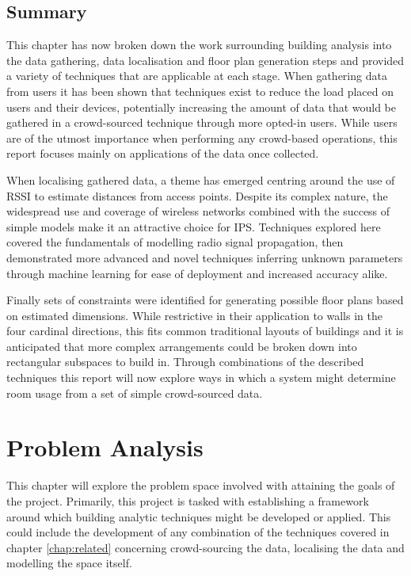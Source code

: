 \documentclass{UoYCSproject}
\begin{document}
        \section{Summary}
        \label{sec:relsum}
        
	        This chapter has now broken down the work surrounding building analysis into the data gathering, data localisation and floor plan generation steps and provided a variety of techniques that are applicable at each stage. When gathering data from users it has been shown that techniques exist to reduce the load placed on users and their devices, potentially increasing the amount of data that would be gathered in a crowd-sourced technique through more opted-in users. While users are of the utmost importance when performing any crowd-based operations, this report focuses mainly on applications of the data once collected.
            
            When localising gathered data, a theme has emerged centring around the use of RSSI to estimate distances from access points. Despite its complex nature, the  widespread use and coverage of wireless networks combined with the success of simple models make it an attractive choice for IPS. Techniques explored here covered the fundamentals of modelling radio signal propagation, then demonstrated more advanced and novel techniques inferring unknown parameters through machine learning for ease of deployment and increased accuracy alike.
            
            Finally sets of constraints were identified for generating possible floor plans based on estimated dimensions. While restrictive in their application to walls in the four cardinal directions, this fits common traditional layouts of buildings and it is anticipated that more complex arrangements could be broken down into rectangular subspaces to build in. Through combinations of the described techniques this report will now explore ways in which a system might determine room usage from a set of simple crowd-sourced data.

    \chapter{Problem Analysis}
    \label{chap:problem}
    
        This chapter will explore the problem space involved with attaining the goals of the project. Primarily, this project is tasked with establishing a framework around which building analytic techniques might be developed or applied. This could include the development of any combination of the techniques covered in chapter \ref{chap:related} concerning crowd-sourcing the data, localising the data and modelling the space itself.
        
\end{document}
